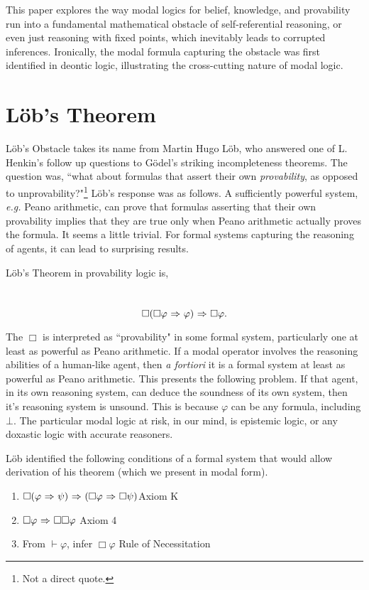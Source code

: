 This paper explores the way modal logics for belief, knowledge, and provability run into a fundamental mathematical obstacle of self-referential reasoning, or even just reasoning with fixed points, which inevitably leads to corrupted inferences. Ironically, the modal formula capturing the obstacle was first identified in deontic logic, illustrating the cross-cutting nature of modal logic.

\section{L\"ob's Theorem}
\label{sec:lob_section}
L\"ob's Obstacle takes its name from Martin Hugo L\"ob, who answered one of L. Henkin's follow up questions to G\"odel's striking incompleteness theorems. The question was, ``what about formulas that assert their own \emph{provability}, as opposed to unprovability?"\footnote{Not a direct quote.} L\"ob's response was as follows. A sufficiently powerful system, \emph{e.g.} Peano arithmetic, can prove that formulas asserting that their own provability implies that they are true only when Peano arithmetic actually proves the formula. It seems a little trivial. For formal systems capturing the reasoning of agents, it can lead to surprising results.

L\"ob's Theorem in provability logic is,
\begin{center}~\label{lob}
	\begin{equation}
		\Box(\Box\varphi {\ \Rightarrow \ } \varphi){\ \Rightarrow \ } \Box\varphi.
	\end{equation}
\end{center}
The $\Box$ is interpreted as ``provability" in some formal system, particularly one at least as powerful as Peano arithmetic. If a modal operator involves the reasoning abilities of a human-like agent, then \emph{a fortiori} it is a formal system at least as powerful as Peano arithmetic. This presents the following problem. If that agent, in its own reasoning system, can deduce the soundness of its own system, then it's reasoning system is unsound. This is because $\varphi$ can be any formula, including $\bot$. The particular modal logic at risk, in our mind, is epistemic logic, or any doxastic logic with accurate reasoners.

L\"ob identified the following conditions of a formal system that would allow derivation of his theorem (which we present in modal form).
\begin{enumerate}
	\item $\Box(\varphi {\ \Rightarrow \ } \psi) {\ \Rightarrow \ } (\Box\varphi {\ \Rightarrow \ } \Box \psi)$\mbox{}\hfill Axiom K
	\item $\Box\varphi {\ \Rightarrow \ } \Box\Box\varphi$ \mbox{}\hfill Axiom 4
	\item From $\vdash \varphi$, infer $\Box\varphi$ \mbox{}\hfill Rule of Necessitation
\end{enumerate}


